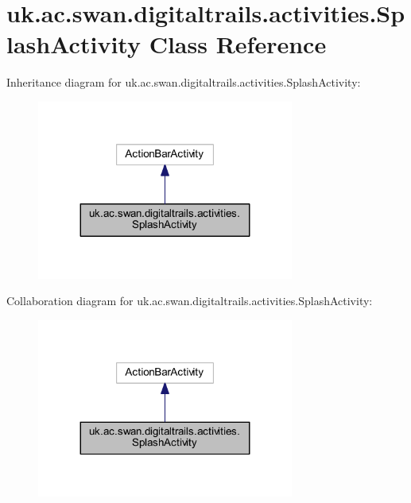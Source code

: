 \hypertarget{classuk_1_1ac_1_1swan_1_1digitaltrails_1_1activities_1_1_splash_activity}{\section{uk.\+ac.\+swan.\+digitaltrails.\+activities.\+Splash\+Activity Class Reference}
\label{classuk_1_1ac_1_1swan_1_1digitaltrails_1_1activities_1_1_splash_activity}
}


Inheritance diagram for uk.\+ac.\+swan.\+digitaltrails.\+activities.\+Splash\+Activity\+:\nopagebreak
\begin{figure}[H]
\begin{center}
\leavevmode
\includegraphics[width=239pt]{classuk_1_1ac_1_1swan_1_1digitaltrails_1_1activities_1_1_splash_activity__inherit__graph}
\end{center}
\end{figure}


Collaboration diagram for uk.\+ac.\+swan.\+digitaltrails.\+activities.\+Splash\+Activity\+:\nopagebreak
\begin{figure}[H]
\begin{center}
\leavevmode
\includegraphics[width=239pt]{classuk_1_1ac_1_1swan_1_1digitaltrails_1_1activities_1_1_splash_activity__coll__graph}
\end{center}
\end{figure}
